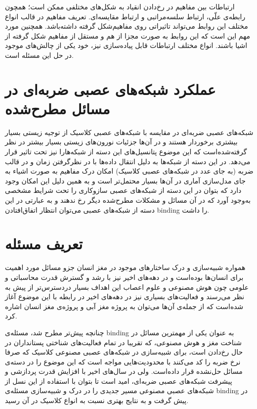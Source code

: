 \documentclass[12pt]{report}
\begin{document}
	ارتباطات بین مفاهیم در رخ‌دادن انقیاد به شکل‌های مختلفی ممکن است؛ همچون رابطه‌ی علّی، ارتباط سلسه‌مراتبی و ارتباط مقایسه‌ای. تعریف مفاهیم در قالب انواع مختلف این روابط می‌تواند تاثیراتی روی مفاهیم‌شکل گرفته داشته‌باشد. همچنین مورد مهم‌ این است که این روابط به صورت مجزا از هم و مستقل از مفاهیم شکل گرفته‌ از اشیا باشند. انواع مختلف ارتباطات قابل پیاده‌سازی نیز، خود یکی از چالش‌های موجود در حل این مسئله است.
	
	\section{عملکرد شبکه‌های عصبی ضربه‌ای در مسائل مطرح‌شده}
	شبکه‌های عصبی ضربه‌ای در مقایسه با شبکه‌های عصبی کلاسیک از توجیه زیستی بسیار بیشتری برخوردار هستند و در آن‌ها جزئیات نورون‌های زیستی بسیار بیشتر در نظر گرفته‌شده‌است که این موضوع پتانسیل‌های این دسته از شبکه‌هارا نیز تحت تاثیر قرار می‌دهد. در این دسته از شبکه‌ها به دلیل انتقال داده‌ها با در نظر‌گرفتن زمان و در قالب ضربه (به جای عدد در شبکه‌‌های عصبی کلاسیک) امکان درک مفاهیم به صورت اشیاء به جای مدل‌سازی آماری در آن‌ها بسیار محتمل‌تر است و به همین دلیل این امکان وجود دارد که بتوان در این دسته از شبکه‌های عصبی سازوکاری را تحت شرایط مشخصی به‌وجود آورد که در آن مسائل و مشکلات مطرح‌شده دیگر رخ ندهند و به عبارتی در این دسته از شبکه‌های عصبی می‌توان انتظار اتفاق‌افتادن \gls{binding} را داشت.
	
	\section{تعریف مسئله}
	همواره شبیه‌سازی و درک ساختار‌های موجود در مغز انسان جزو مسائل مورد اهمیت برای انسان‌ها بوده‌است و در دهه‌های اخیر نیز با رشد و گسترش قدرت محاسباتی و علومی چون هوش مصنوعی و علوم اعصاب این اهداف بسیار دردسترس‌تر از پیش به نظر می‌رسند و فعالیت‌های بسیاری نیز در دهه‌های اخیر در رابطه با این موضوع آغاز شده‌است که از جمله‌ی آن‌ها می‌توان به پروژه مغز آبی و پروژه‌ی مغز انسان اشاره کرد.
	
	چنانچه پیش‌تر مطرح شد، مسئله‌ی \gls{binding} به عنوان یکی از مهمترین مسائل در شناخت مغز و هوش مصنوعی، که تقریبا در تمام فعالیت‌های شناختی پستانداران در حال رخ‌دادن است، برای شبیه‌سازی در شبکه‌های عصبی مصنوعی کلاسیک که صرفا نرخ ضربه را کد می‌کنند با محدودیت‌هایی مواجه است \cite{vonderMalsburg1999} که این موضوع را در دسته‌ی مسائل حل‌نشده قرار داده‌است. ولی در سال‌های اخیر با افزایش قدرت پردازشی و پیشرفت شبکه‌های عصبی ضربه‌ای‌، امید است تا بتوان با استفاده از این نسل از شبکه‌های عصبی مصنوعی مسیر جدیدی را در درک و شبیه‌سازی مسئله‌ی \gls{binding} در پیش گرفت و به نتایج بهتری نسبت به انواع کلاسیک در آن رسید.
	
\end{document}

